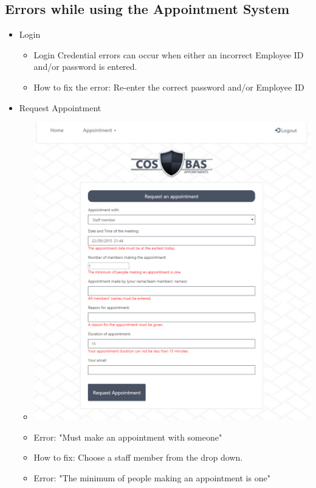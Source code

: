 \subsection{Errors while using the Appointment System}
	\begin{itemize}
		\item Login
			\begin{itemize}
				\item Login Credential errors can occur when either an incorrect Employee ID  and/or password is entered. 
				\item How to fix the error: Re-enter the correct password and/or Employee ID
			\end{itemize}
		\item Request Appointment
			\begin{itemize}
				\item \includegraphics[width=\linewidth]{images/Screenshots/RequestAppoint_Errors.png}
				\item Error: "Must make an appointment with someone"
				\item How to fix: Choose a staff member from the drop down.
				\item Error: "The minimum of people making an appointment is one"

\end{itemize}
\end{itemize}
